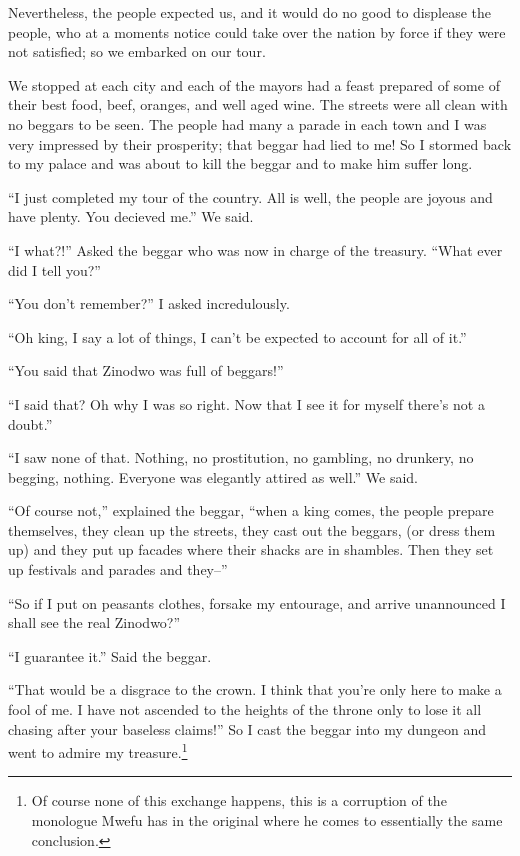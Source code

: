 Nevertheless, the people expected us, and it would do no good to displease the people, who at a moments notice could take over the nation by force if they were not satisfied; so we embarked on our tour. 

We stopped at each city and each of the mayors had a feast prepared of some of their best food, beef, oranges, and well aged wine. The streets were all clean with no beggars to be seen. The people had many a parade in each town and I was very impressed by their prosperity; that beggar had lied to me! So I stormed back to my palace and was about to kill the beggar and to make him suffer long.

``I just completed my tour of the country. All is well, the people are joyous and have plenty. You decieved me.'' We said.

``I what?!'' Asked the beggar who was now in charge of the treasury. ``What ever did I tell you?''

``You don't remember?'' I asked incredulously.

``Oh king, I say a lot of things, I can't be expected to account for all of it.''

``You said that Zinodwo was full of beggars!''

``I said that? Oh why I was so right. Now that I see it for myself there's not a doubt.''

``I saw none of that. Nothing, no prostitution, no gambling, no drunkery, no begging, nothing. Everyone was elegantly attired as well.'' We said.

``Of course not,'' explained the beggar, ``when a king comes, the people prepare themselves, they clean up the streets, they cast out the beggars, (or dress them up) and they put up facades where their shacks are in shambles. Then they set up festivals and parades and they--''

``So if I put on peasants clothes, forsake my entourage, and arrive unannounced I shall see the real Zinodwo?''

``I guarantee it.'' Said the beggar.

``That would be a disgrace to the crown. I think that you're only here to make a fool of me. I have not ascended to the heights of the throne only to lose it all chasing after your baseless claims!'' So I cast the beggar into my dungeon and went to admire my treasure.\footnote{Of course none of this exchange happens, this is a corruption of the monologue Mwefu has in the original where he comes to essentially the same conclusion.}

